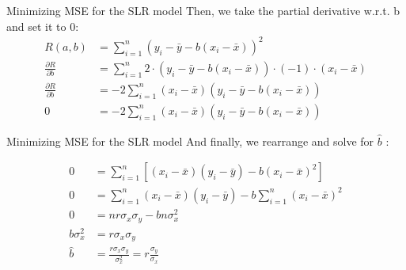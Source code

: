 \documentclass[aspectratio=169]{../latex_main/tntbeamer}  %
\begin{document}
	
	
	\begin{frame}{Minimizing MSE for the SLR model}
	       Then, we take the partial derivative w.r.t. b and set it to 0:
            	\begin{align*}
            	    R(a,b) &= \sum_{i=1}^n(y_i- \bar{y}-b(x_i  -\bar{x}))^2\\
	                \frac{\partial R}{\partial  b} &= \sum_{i=1}^n2\cdot(y_i-\bar{y}-b(x_i-\bar{x}))\cdot(-1)\cdot(x_i-\bar{x})\\
	                \frac{\partial R}{\partial  b} &=-2 \sum_{i=1}^n(x_i-\bar{x})(y_i-\bar{y}-b(x_i-\bar{x}))\\
	                      0 &=  -2 \sum_{i=1}^n(x_i-\bar{x})(y_i-\bar{y}-b(x_i-\bar{x}))
                 \end{align*}
	\end{frame}
	
	
	\begin{frame}{Minimizing MSE for the SLR model}
	       And finally, we rearrange and solve for   $\hat{b}$  :

            	\begin{align*}
	                0 &= \sum_{i=1}^n\left[(x_i-\bar{x})(y_i-\bar{y})-b(x_i-\bar{x})^2\right]\\
	                0 &= \sum_{i=1}^n(x_i-\bar{x})(y_i-\bar{y})-b\sum_{i=1}^n(x_i-\bar{x})^2\\
	                0 &= nr\sigma_x\sigma_y - bn\sigma_{x}^2\\
	                b\sigma_{x}^2 &= r\sigma_x\sigma_y\\
	                \hat{b} &= \frac{r\sigma_x\sigma_y}{\sigma_{x}^2} = r\frac{\sigma_y}{\sigma_x} 
                 \end{align*}
	\end{frame}
	
\end{document}
